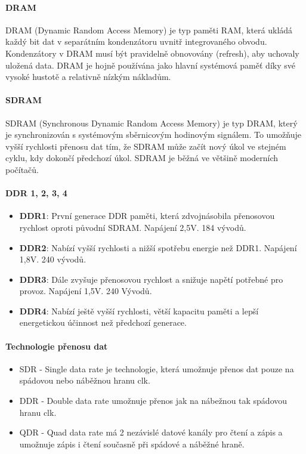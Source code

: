 \paragraph{DRAM}
DRAM (Dynamic Random Access Memory) je typ paměti RAM, která ukládá každý bit dat v separátním kondenzátoru uvnitř integrovaného obvodu. Kondenzátory v DRAM musí být pravidelně obnovovány (refresh), aby uchovaly uložená data. DRAM je hojně používána jako hlavní systémová paměť díky své vysoké hustotě a relativně nízkým nákladům.

\paragraph{SDRAM}
SDRAM (Synchronous Dynamic Random Access Memory) je typ DRAM, který je synchronizován s systémovým sběrnicovým hodinovým signálem. To umožňuje vyšší rychlosti přenosu dat tím, že SDRAM může začít nový úkol ve stejném cyklu, kdy dokončí předchozí úkol. SDRAM je běžná ve většině moderních počítačů.

\paragraph{DDR 1, 2, 3, 4}
\begin{itemize}
\item \textbf{DDR1}: První generace DDR paměti, která zdvojnásobila přenosovou rychlost oproti původní SDRAM. Napájení 2,5V. 184 vývodů.
\item \textbf{DDR2}: Nabízí vyšší rychlosti a nižší spotřebu energie než DDR1. Napájení 1,8V. 240 vývodů.
\item \textbf{DDR3}: Dále zvyšuje přenosovou rychlost a snižuje napětí potřebné pro provoz. Napájení 1,5V. 240 Vývodů.
\item \textbf{DDR4}: Nabízí ještě vyšší rychlosti, větší kapacitu paměti a lepší energetickou účinnost než předchozí generace.
\end{itemize}

\paragraph{Technologie přenosu dat}
\begin{itemize}
    \item SDR - Single data rate je technologie, která umožnuje přenos dat pouze na spádovou nebo náběžnou hranu clk.
    \item DDR - Double data rate umožnuje přenos jak na nábežnou tak spádovou hranu clk.
    \item QDR - Quad data rate má 2 nezávislé datové kanály pro čtení a zápis a umožnuje zápis i čtení současně při spádové a náběžné hraně.
\end{itemize}

